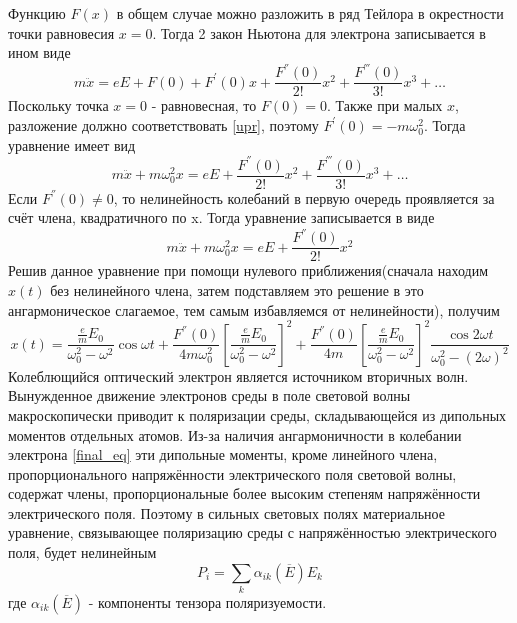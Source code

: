 \documentclass[12pt,a5paper,titlepage, main = russian]{article}
\begin{document}
Функцию $F(x)$ в общем случае можно разложить в ряд Тейлора в окрестности точки равновесия $x=0$. Тогда 2 закон Ньютона для электрона записывается в ином виде
\begin{equation}
m \ddot{x} = eE + F(0) + F^{'}(0)x + \frac{F^{''}(0)}{2!}x^2 + \frac{F^{'''}(0)}{3!}x^3 + \ldots
\end{equation}
Поскольку точка $x = 0$ - равновесная, то $F(0) = 0$. Также при малых $x$, разложение должно соответствовать \eqref{upr}, поэтому $F^{'}(0) = -m \omega^2_0$. Тогда уравнение имеет вид
\begin{equation}
m \ddot{x} + m \omega^2_0 x = eE + \frac{F^{''}(0)}{2!}x^2 + \frac{F^{'''}(0)}{3!}x^3 + \ldots
\end{equation}
Если $F^{''}(0) \neq 0$, то нелинейность колебаний в первую очередь
проявляется за счёт члена, квадратичного по x. Тогда уравнение записывается в виде
\begin{equation}
m \ddot{x} + m \omega^2_0 x = eE + \frac{F^{''}(0)}{2!}x^2
\label{final_eq}
\end{equation}
Решив данное уравнение при помощи нулевого приближения(сначала находим $x(t)$ без нелинейного члена, затем подставляем это решение в это ангармоническое слагаемое, тем самым избавляемся от нелинейности), получим
\begin{equation}
x(t) = \frac{\frac{e}{m} E_0}{\omega^2_0 - \omega^2} \cos \omega t + \frac{F^{''}(0)}{4m\omega^2_0} \left[ \frac{\frac{e}{m} E_0}{\omega^2_0-\omega^2} \right]^2 + \frac{F^{''}(0)}{4m} \left[ \frac{\frac{e}{m} E_0}{\omega^2_0-\omega^2} \right]^2 \frac{\cos 2 \omega t}{\omega^2_0 - (2 \omega)^2}
\label{x}
\end{equation}
Колеблющийся оптический электрон является источником вторичных волн. Вынужденное движение электронов среды в поле световой волны макроскопически приводит к поляризации среды, складывающейся из дипольных моментов отдельных атомов. Из-за наличия ангармоничности в колебании электрона \eqref{final_eq} эти дипольные моменты, кроме линейного члена, пропорционального напряжённости электрического поля световой волны, содержат члены, пропорциональные более высоким степеням напряжённости электрического поля. Поэтому в сильных световых полях материальное уравнение, связывающее поляризацию среды с напряжённостью электрического поля, будет нелинейным
\begin{equation}
P_i = \sum_{k} \alpha_{ik}(\overline{E}) E_k
\end{equation}
где $\alpha_{ik}(\overline{E})$ - компоненты тензора поляризуемости.
\end{document}
